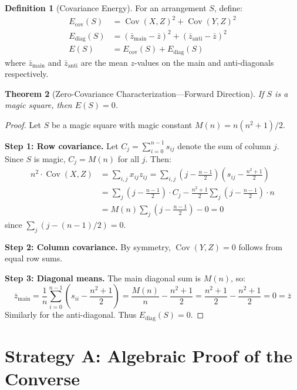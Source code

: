 \documentclass[11pt]{article}
\newtheorem{theorem}{Theorem}[section]
\theoremstyle{definition}
\newtheorem{definition}[theorem]{Definition}
\theoremstyle{remark}
\begin{document}
\begin{definition}[Covariance Energy]
For an arrangement $S$, define:
\begin{align}
E_{\text{cov}}(S) &= \operatorname{Cov}(X, Z)^2 + \operatorname{Cov}(Y, Z)^2 \\
E_{\text{diag}}(S) &= \left( \bar{z}_{\text{main}} - \bar{z} \right)^2 + \left( \bar{z}_{\text{anti}} - \bar{z} \right)^2 \\
E(S) &= E_{\text{cov}}(S) + E_{\text{diag}}(S)
\end{align}
where $\bar{z}_{\text{main}}$ and $\bar{z}_{\text{anti}}$ are the mean $z$-values on the main and anti-diagonals respectively.
\end{definition}

\begin{theorem}[Zero-Covariance Characterization---Forward Direction]\label{thm:forward}
If $S$ is a magic square, then $E(S) = 0$.
\end{theorem}

\begin{proof}
Let $S$ be a magic square with magic constant $M(n) = n(n^2+1)/2$.

\textbf{Step 1: Row covariance.} Let $C_j = \sum_{i=0}^{n-1} s_{ij}$ denote the sum of column $j$. Since $S$ is magic, $C_j = M(n)$ for all $j$. Then:
\begin{align*}
n^2 \cdot \operatorname{Cov}(X, Z) &= \sum_{i,j} x_{ij} z_{ij} = \sum_{i,j} \left( j - \frac{n-1}{2} \right) \left( s_{ij} - \frac{n^2+1}{2} \right) \\
&= \sum_j \left( j - \frac{n-1}{2} \right) \cdot C_j - \frac{n^2+1}{2} \sum_j \left( j - \frac{n-1}{2} \right) \cdot n \\
&= M(n) \sum_j \left( j - \frac{n-1}{2} \right) - 0 = 0
\end{align*}
since $\sum_j (j - (n-1)/2) = 0$.

\textbf{Step 2: Column covariance.} By symmetry, $\operatorname{Cov}(Y, Z) = 0$ follows from equal row sums.

\textbf{Step 3: Diagonal means.} The main diagonal sum is $M(n)$, so:
\[
\bar{z}_{\text{main}} = \frac{1}{n} \sum_{i=0}^{n-1} \left( s_{ii} - \frac{n^2+1}{2} \right) = \frac{M(n)}{n} - \frac{n^2+1}{2} = \frac{n^2+1}{2} - \frac{n^2+1}{2} = 0 = \bar{z}
\]
Similarly for the anti-diagonal. Thus $E_{\text{diag}}(S) = 0$.
\end{proof}

\section{Strategy A: Algebraic Proof of the Converse}
\end{document}
